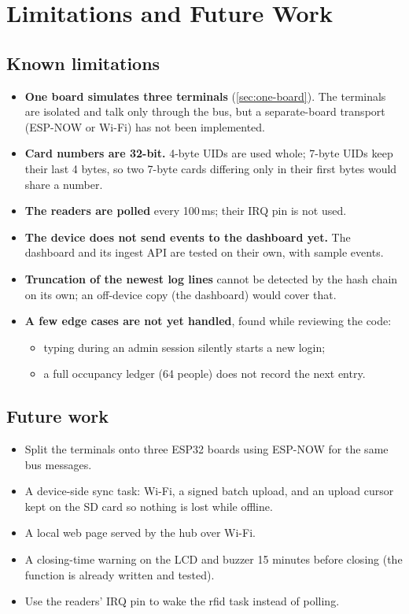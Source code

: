 \section{Limitations and Future Work}
\label{sec:limitations}

\subsection{Known limitations}
\begin{itemize}
  \item \textbf{One board simulates three terminals} (\cref{sec:one-board}). The terminals are
        isolated and talk only through the bus, but a separate-board transport (ESP-NOW or Wi-Fi)
        has not been implemented.
  \item \textbf{Card numbers are 32-bit.} 4-byte UIDs are used whole; 7-byte UIDs keep their last
        4 bytes, so two 7-byte cards differing only in their first bytes would share a number.
  \item \textbf{The readers are polled} every 100\,ms; their IRQ pin is not used.
  \item \textbf{The device does not send events to the dashboard yet.} The dashboard and its
        ingest API are tested on their own, with sample events.
  \item \textbf{Truncation of the newest log lines} cannot be detected by the hash chain on its
        own; an off-device copy (the dashboard) would cover that.
  \item \textbf{A few edge cases are not yet handled}, found while reviewing the code:
        \begin{itemize}
          \item typing  during an admin session silently starts a new login;
          \item a full occupancy ledger (64 people) does not record the next entry.
        \end{itemize}
\end{itemize}

\subsection{Future work}
\begin{itemize}
  \item Split the terminals onto three ESP32 boards using ESP-NOW for the same bus messages.
  \item A device-side sync task: Wi-Fi, a signed batch upload, and an upload cursor kept on the SD
        card so nothing is lost while offline.
  \item A local web page served by the hub over Wi-Fi.
  \item A closing-time warning on the LCD and buzzer 15 minutes before closing (the function
         is already written and tested).
  \item Use the readers' IRQ pin to wake the rfid task instead of polling.
\end{itemize}
